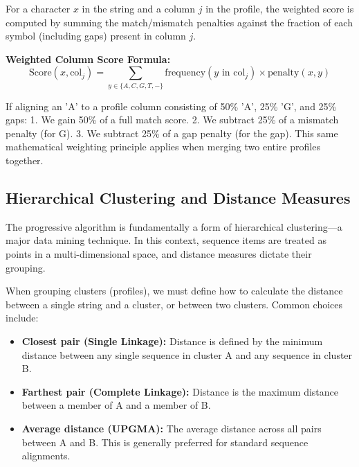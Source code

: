 For a character $x$ in the string and a column $j$ in the profile, the weighted score is computed by summing the match/mismatch penalties against the fraction of each symbol (including gaps) present in column $j$.

\begin{important}
  \textbf{Weighted Column Score Formula:}
  \[
  \text{Score}(x, \text{col}_j) = \sum_{y \in \{A,C,G,T,-\}} \text{frequency}(y \text{ in col}_j) \times \text{penalty}(x, y)
  \]
\end{important}

If aligning an 'A' to a profile column consisting of 50\% 'A', 25\% 'G', and 25\% gaps:
1. We gain 50\% of a full match score.
2. We subtract 25\% of a mismatch penalty (for G).
3. We subtract 25\% of a gap penalty (for the gap).
This same mathematical weighting principle applies when merging two entire profiles together.

\subsection{Hierarchical Clustering and Distance Measures}
The progressive algorithm is fundamentally a form of hierarchical clustering—a major data mining technique. In this context, sequence items are treated as points in a multi-dimensional space, and distance measures dictate their grouping.


When grouping clusters (profiles), we must define how to calculate the distance between a single string and a cluster, or between two clusters. Common choices include:
\begin{itemize}
  \item \textbf{Closest pair (Single Linkage):} Distance is defined by the minimum distance between any single sequence in cluster A and any sequence in cluster B.
  \item \textbf{Farthest pair (Complete Linkage):} Distance is the maximum distance between a member of A and a member of B.
  \item \textbf{Average distance (UPGMA):} The average distance across all pairs between A and B. This is generally preferred for standard sequence alignments.
\end{itemize}

